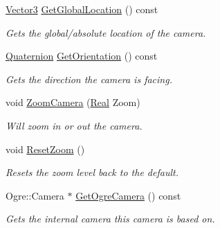 \begin{DoxyCompactItemize}
\hyperlink{classphys_1_1Vector3}{Vector3} \hyperlink{classphys_1_1Camera_a7f71146cd533f6a1fc8426a9ed40b763}{GetGlobalLocation} () const 
\begin{DoxyCompactList}\small\item\em Gets the global/absolute location of the camera. \item\end{DoxyCompactList}\item 
\hyperlink{classphys_1_1Quaternion}{Quaternion} \hyperlink{classphys_1_1Camera_a48e0b33e0f12247bc0a0e0d6f759683e}{GetOrientation} () const 
\begin{DoxyCompactList}\small\item\em Gets the direction the camera is facing. \item\end{DoxyCompactList}\item 
void \hyperlink{classphys_1_1Camera_a1cb593d12be4e6e1e51cb8f74ce2d97c}{ZoomCamera} (\hyperlink{namespacephys_af7eb897198d265b8e868f45240230d5f}{Real} Zoom)
\begin{DoxyCompactList}\small\item\em Will zoom in or out the camera. \item\end{DoxyCompactList}\item 
void \hyperlink{classphys_1_1Camera_a181465e6add36c07a63fdd26aee7c69a}{ResetZoom} ()
\begin{DoxyCompactList}\small\item\em Resets the zoom level back to the default. \item\end{DoxyCompactList}\item 
Ogre::Camera $\ast$ \hyperlink{classphys_1_1Camera_a4f78f7a62580fa538d5bf2cb361644b2}{GetOgreCamera} () const 
\begin{DoxyCompactList}\small\item\em Gets the internal camera this camera is based on. \item\end{DoxyCompactList}\end{DoxyCompactItemize}
